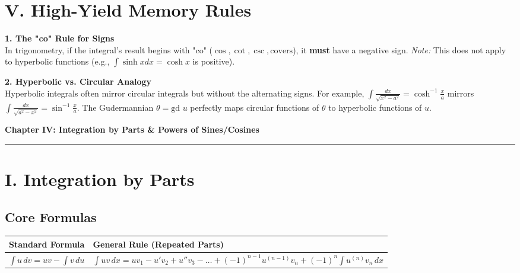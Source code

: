 \documentclass[11pt, a4paper]{article}
\begin{document}
\vspace{0.3cm}

\section*{\color{primary} V. High-Yield Memory Rules}

\textbf{1. The "co" Rule for Signs}\\
In trigonometry, if the integral's result begins with "co" ($\cos, \cot, \csc, \text{covers}$), it \textbf{must} have a negative sign. \textit{Note:} This does not apply to hyperbolic functions (e.g., $\int \sinh x dx = \cosh x$ is positive).

\textbf{2. Hyperbolic vs. Circular Analogy}\\
Hyperbolic integrals often mirror circular integrals but without the alternating signs. For example, $\int \frac{dx}{\sqrt{x^2-a^2}} = \cosh^{-1}\frac{x}{a}$ mirrors $\int \frac{dx}{\sqrt{a^2-x^2}} = \sin^{-1}\frac{x}{a}$. The Gudermannian $\theta = \text{gd } u$ perfectly maps circular functions of $\theta$ to hyperbolic functions of $u$.

\newpage

\begin{center}
    {\LARGE \bfseries \color{accent} Chapter IV: Integration by Parts \& Powers of Sines/Cosines}\\
    \vspace{0.2cm}
    {\color{accent}\rule{0.55\linewidth}{0.8pt}}
\end{center}
\vspace{0.35cm}


\section*{\color{primary} I. Integration by Parts}

\subsection*{\color{secondary} Core Formulas}
\begin{center}
\begin{tabular}{@{}p{} p{}@{}}
\toprule
\textbf{Standard Formula} & \textbf{General Rule (Repeated Parts)} \\
\midrule
$\int u \, dv = uv - \int v \, du$ & $\int u v \, dx = u v_1 - u' v_2 + u'' v_3 - \dots + (-1)^{n-1} u^{(n-1)} v_n + (-1)^n \int u^{(n)} v_n \, dx$ \\
\bottomrule
\end{tabular}
\end{center}
\end{document}
